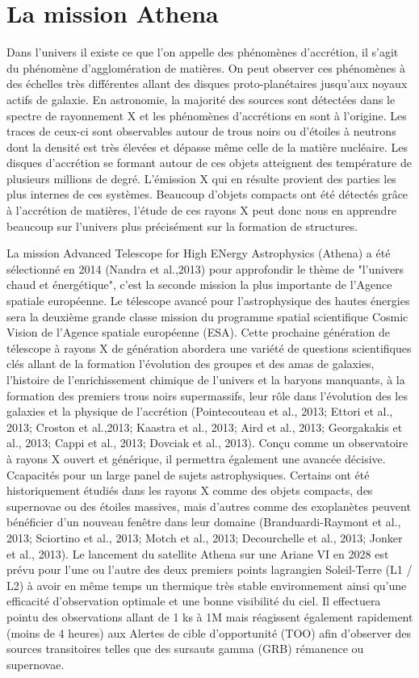 \documentclass[12pt,a4paper]{report}
\begin{document}
\chapter{La mission Athena}
Dans l'univers il existe ce que l'on appelle des phénomènes d’accrétion, il s'agit du phénomène d'agglomération de matières. On peut observer ces phénomènes à des échelles très différentes allant des disques proto-planétaires jusqu'aux noyaux actifs de galaxie. En astronomie, la majorité des sources sont détectées dans le spectre de rayonnement X et les phénomènes d'accrétions en sont à l'origine. Les traces de ceux-ci sont observables autour de trous noirs ou d’étoiles à neutrons dont la densité est très élevées et dépasse même celle de la matière nucléaire. Les disques d’accrétion se formant autour de ces objets atteignent des température de plusieurs millions de degré. L’émission X qui en résulte provient des parties les plus internes de ces systèmes. Beaucoup d'objets compacts ont été détectés grâce à l'accrétion de matières, l'étude de ces rayons X peut donc nous en apprendre beaucoup sur l'univers  plus précisément sur la formation de structures.

La mission Advanced Telescope for High ENergy Astrophysics (Athena) a été sélectionné en 2014 (Nandra et al.,2013) pour approfondir le thème de "l'univers chaud et énergétique", c'est la seconde mission la plus importante de l'Agence spatiale européenne. Le télescope avancé pour l'astrophysique des hautes énergies sera la deuxième grande classe mission du programme spatial scientifique Cosmic Vision de l’Agence spatiale européenne (ESA). Cette prochaine génération de télescope à rayons X de génération abordera une variété de questions scientifiques clés allant de la formation l’évolution des groupes et des amas de galaxies, l’histoire de l’enrichissement chimique de l’univers et la baryons manquants, à la formation des premiers trous noirs supermassifs, leur rôle dans l’évolution des les galaxies et la physique de l'accrétion (Pointecouteau et al., 2013; Ettori et al., 2013; Croston et al.,2013; Kaastra et al., 2013; Aird et al., 2013; Georgakakis et al., 2013; Cappi et al., 2013; Dovciak et al., 2013). Conçu comme un observatoire à rayons X ouvert et générique, il permettra également une avancée décisive. Ccapacités pour un large panel de sujets astrophysiques. Certains ont été historiquement étudiés dans les rayons X comme des objets compacts, des supernovae ou des étoiles massives, mais d’autres comme des exoplanètes peuvent bénéficier d’un nouveau fenêtre dans leur domaine (Branduardi-Raymont et al., 2013; Sciortino et al., 2013; Motch et al., 2013; Decourchelle et al., 2013; Jonker et al., 2013). Le lancement du satellite Athena sur une Ariane VI en 2028 est prévu pour l’une ou l’autre des deux premiers points lagrangien Soleil-Terre (L1 / L2) à avoir en même temps un thermique très stable environnement ainsi qu’une efficacité d’observation optimale et une bonne visibilité du ciel. Il effectuera pointu des observations allant de 1 ks à 1M mais réagissent également rapidement (moins de 4 heures) aux Alertes de cible d'opportunité (TOO) afin d'observer des sources transitoires telles que des sursauts gamma (GRB) rémanence ou supernovae.
\end{document}
